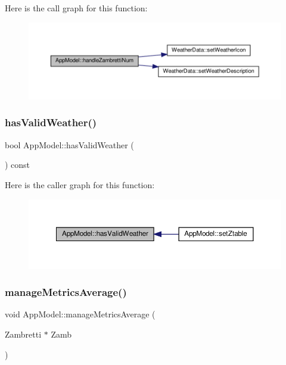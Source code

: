 Here is the call graph for this function\+:\nopagebreak
\begin{figure}[H]
\begin{center}
\leavevmode
\includegraphics[width=350pt]{class_app_model_a75d2b6e818885a77f1b1dd56fc3c9cd3_cgraph}
\end{center}
\end{figure}
\mbox{\label{class_app_model_a6ec5b34a1839a7141979709418174ad1}} 
\subsubsection{\texorpdfstring{has\+Valid\+Weather()}{hasValidWeather()}}
{\footnotesize\ttfamily bool App\+Model\+::has\+Valid\+Weather (\begin{DoxyParamCaption}{ }\end{DoxyParamCaption}) const}

Here is the caller graph for this function\+:\nopagebreak
\begin{figure}[H]
\begin{center}
\leavevmode
\includegraphics[width=350pt]{class_app_model_a6ec5b34a1839a7141979709418174ad1_icgraph}
\end{center}
\end{figure}
\mbox{\label{class_app_model_a91f558862aad6b2509f03e49b549270e}} 
\subsubsection{\texorpdfstring{manage\+Metrics\+Average()}{manageMetricsAverage()}}
{\footnotesize\ttfamily void App\+Model\+::manage\+Metrics\+Average (\begin{DoxyParamCaption}\item[{Zambretti $\ast$}]{Zamb }\end{DoxyParamCaption})}

